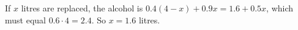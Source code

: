 If $x$ litres are replaced, the alcohol is $0.4(4-x)+0.9x=1.6+0.5x$, which must equal $0.6\cdot4=2.4$. So $x=\boxed{1.6}$ litres.
